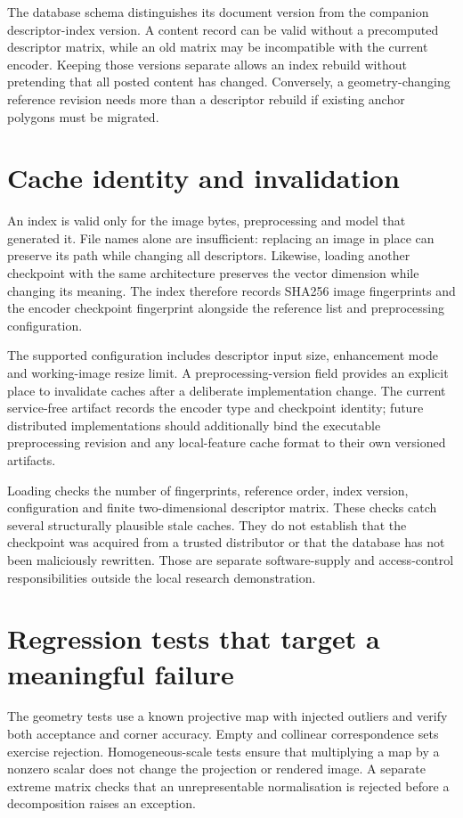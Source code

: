 The database schema distinguishes its document version from the companion descriptor-index version. A content record can be valid without a precomputed descriptor matrix, while an old matrix may be incompatible with the current encoder. Keeping those versions separate allows an index rebuild without pretending that all posted content has changed. Conversely, a geometry-changing reference revision needs more than a descriptor rebuild if existing anchor polygons must be migrated.

\section{Cache identity and invalidation}
An index is valid only for the image bytes, preprocessing and model that generated it. File names alone are insufficient: replacing an image in place can preserve its path while changing all descriptors. Likewise, loading another checkpoint with the same architecture preserves the vector dimension while changing its meaning. The index therefore records SHA256 image fingerprints and the encoder checkpoint fingerprint alongside the reference list and preprocessing configuration.

The supported configuration includes descriptor input size, enhancement mode and working-image resize limit. A preprocessing-version field provides an explicit place to invalidate caches after a deliberate implementation change. The current service-free artifact records the encoder type and checkpoint identity; future distributed implementations should additionally bind the executable preprocessing revision and any local-feature cache format to their own versioned artifacts.

Loading checks the number of fingerprints, reference order, index version, configuration and finite two-dimensional descriptor matrix. These checks catch several structurally plausible stale caches. They do not establish that the checkpoint was acquired from a trusted distributor or that the database has not been maliciously rewritten. Those are separate software-supply and access-control responsibilities outside the local research demonstration.

\section{Regression tests that target a meaningful failure}
The geometry tests use a known projective map with injected outliers and verify both acceptance and corner accuracy. Empty and collinear correspondence sets exercise rejection. Homogeneous-scale tests ensure that multiplying a map by a nonzero scalar does not change the projection or rendered image. A separate extreme matrix checks that an unrepresentable normalisation is rejected before a decomposition raises an exception.

